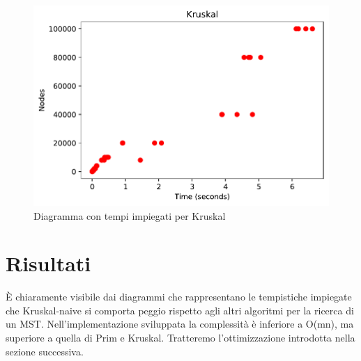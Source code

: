 \begin{figure}[htp]
    \centering
    \includegraphics[width=\textwidth]{immagini/kruskal.pdf}
    \caption{Diagramma con tempi impiegati per Kruskal}
    \label{fig:diagramma-kruskal}
\end{figure}

\clearpage

\section{Risultati\label{sec:risultati}}
È chiaramente visibile dai diagrammi che rappresentano le tempistiche impiegate che Kruskal-naive si comporta peggio rispetto agli altri algoritmi per la ricerca di un MST.
Nell'implementazione sviluppata la complessità è inferiore a O(mn), ma superiore a quella di Prim e Kruskal.
Tratteremo l'ottimizzazione introdotta nella sezione successiva.